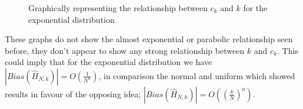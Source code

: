 \documentclass[12pt]{report}
\begin{document}
\begin{figure}
\caption{Graphically representing the relationship between $c_{k}$ and $k$ for the exponential distribution} \label{c_k_expo}
\end{figure}

These graphs do not show the almost exponential or parabolic relationship seen before, they don't appear to show any strong relationship between $k$ and $c_{k}$. This could imply that for the exponential distribution we have $|Bias (\hat{H}_{N, k}) | = O \left( \frac{1}{N^{a}} \right)$, in comparison the normal and uniform which showed results in favour of the opposing idea;  $| Bias (\hat{H}_{N, k}) | = O\left( \left( \frac{k}{N} \right)^{a} \right)$.
\end{document}
